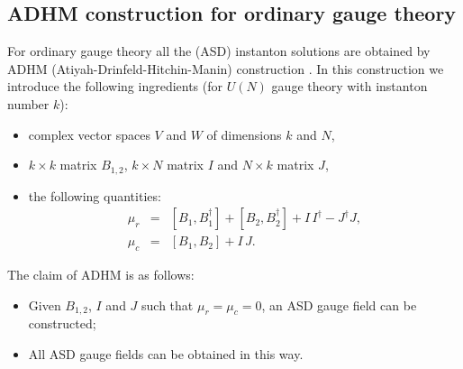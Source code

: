 \documentclass[a4paper,a4paper]{article}
\begin{document}
\subsection{ADHM construction for ordinary gauge theory}

For ordinary gauge theory all the (ASD) instanton solutions are
obtained by ADHM (Atiyah-Drinfeld-Hitchin-Manin) construction
\cite{ADHM}. In this construction we introduce the following
ingredients (for $U(N)$ gauge theory with instanton number $k$):
\begin{itemize}
\item complex vector spaces $V$ and $W$ of dimensions $k$ and $N$,
\item $k\times k$ matrix $B_{1,2}$, $k\times N$ matrix $I$ and
$N\times k$ matrix $J$,
\item the following quantities:
\begin{eqnarray}
\label{ADHM1}
\mu_r & = & [B_1, B_1^\dagger] + [B_2, B_2^\dagger] + I \,
I^\dagger -J^\dagger J, \\
\label{ADHM2}
\mu_c & = & [B_1,B_2] + I\, J.
\end{eqnarray}
\end{itemize}
The claim of ADHM is as follows:
\begin{itemize}
\item Given $B_{1,2}$, $I$ and $J$ such that $\mu_r=\mu_c=0$, an
ASD gauge field can be constructed;
\item All ASD gauge fields can be obtained in this way.
\end{itemize}
\end{document}
